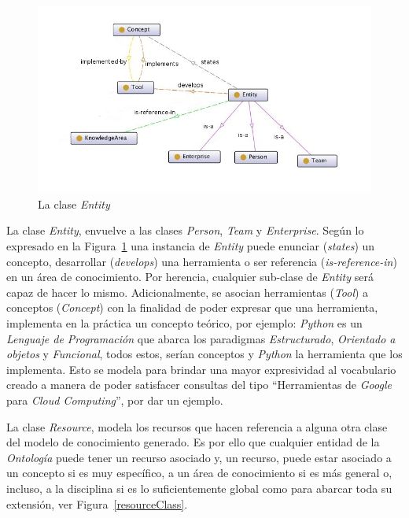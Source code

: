 \begin{itemize}
\begin{figure}[!h]
    \begin{center}
        \includegraphics[scale=0.5]{images/onto_entity_relations.jpg}
        \caption{La clase \textit{Entity}}
        \label{entityRelations}
    \end{center}
\end{figure}

La clase \textit{Entity}, envuelve a las clases \textit{Person}, \textit{Team} y \textit{Enterprise}. Según lo expresado en la Figura~\ref{entityRelations} una instancia de \textit{Entity} puede enunciar (\textit{states}) un concepto, desarrollar (\textit{develops}) una herramienta o ser referencia (\textit{is-reference-in}) en un área de conocimiento. Por herencia, cualquier sub-clase de \textit{Entity} será capaz de hacer lo mismo. Adicionalmente, se asocian herramientas (\textit{Tool}) a conceptos (\textit{Concept}) con la finalidad de poder expresar que una herramienta, implementa en la práctica un concepto teórico, por ejemplo: \textit{Python} es un \textit{Lenguaje de Programación} que abarca los paradigmas \textit{Estructurado}, \textit{Orientado a objetos} y \textit{Funcional}, todos estos, serían conceptos y \textit{Python} la herramienta que los implementa. Esto se modela para brindar una mayor expresividad al vocabulario creado a manera de poder satisfacer consultas del tipo ``Herramientas de \textit{Google} para \textit{Cloud Computing}'', por dar un ejemplo.

La clase \textit{Resource}, modela los recursos que hacen referencia a alguna otra clase del modelo de conocimiento generado. Es por ello que cualquier entidad de la \textit{Ontología} puede tener un recurso asociado y, un recurso, puede estar asociado a un concepto si es muy específico, a un área de conocimiento si es más general o, incluso, a la disciplina si es lo suficientemente global como para abarcar toda su extensión, ver Figura~\ref{resourceClass}.


\end{itemize}
